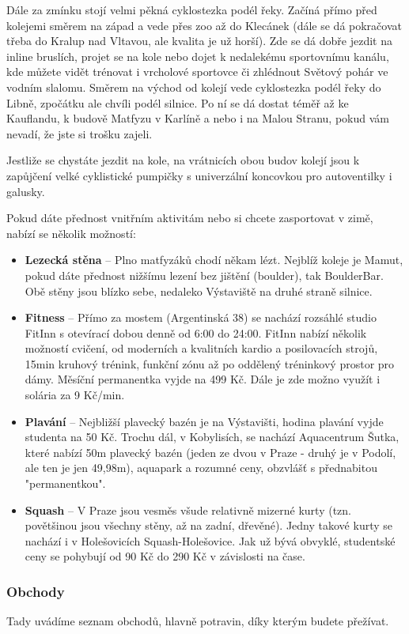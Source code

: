 Dále za zmínku stojí velmi pěkná cyklostezka podél řeky. Začíná přímo před
kolejemi směrem na západ a vede přes zoo až do Klecánek (dále se dá pokračovat
třeba do Kralup nad Vltavou, ale kvalita je už horší). Zde se dá dobře jezdit na
inline bruslích, projet se na kole nebo dojet k nedalekému sportovnímu kanálu,
kde můžete vidět trénovat i vrcholové sportovce či zhlédnout Světový pohár ve
vodním slalomu. Směrem na východ od kolejí vede cyklostezka podél řeky do Libně,
zpočátku ale chvíli podél silnice. Po ní se dá dostat téměř až ke Kauflandu, k
budově Matfyzu v Karlíně a nebo i na Malou Stranu, pokud vám nevadí, že jste si
trošku zajeli.

Jestliže se chystáte jezdit na kole, na vrátnicích obou budov kolejí jsou k
zapůjčení velké cyklistické pumpičky s univerzální koncovkou pro autoventilky i
galusky.

Pokud dáte přednost vnitřním aktivitám nebo si chcete zasportovat v zimě, nabízí
se několik možností:
\begin{itemize}
\item \textbf{Lezecká stěna} – Plno matfyzáků chodí někam lézt. Nejblíž koleje
je Mamut, pokud dáte přednost nižšímu lezení bez jištění (boulder), tak
BoulderBar. Obě stěny jsou blízko sebe, nedaleko Výstaviště na druhé straně
silnice.
\item \textbf{Fitness} – Přímo za mostem (Argentinská 38) se nachází rozsáhlé
studio FitInn s otevírací dobou denně od 6:00 do 24:00. FitInn nabízí několik
možností cvičení, od moderních a kvalitních kardio a posilovacích strojů, 15min
kruhový trénink, funkční zónu až po oddělený tréninkový prostor pro dámy.
Měsíční permanentka vyjde na 499 Kč. Dále je zde možno využít i solária za 9
Kč/min.
\item \textbf{Plavání} – Nejbližší plavecký bazén je na Výstavišti, hodina
plavání vyjde studenta na 50 Kč. Trochu dál, v Kobylisích, se nachází
Aquacentrum Šutka, které nabízí 50m plavecký bazén (jeden ze dvou v Praze -
druhý je v Podolí, ale ten je jen 49,98m), aquapark a rozumné ceny, obzvlášť s
přednabitou "permanentkou".
\item \textbf{Squash} – V Praze jsou vesměs všude relativně mizerné kurty (tzn.
povětšinou jsou všechny stěny, až na zadní, dřevěné). Jedny takové kurty se
nachází i v Holešovicích Squash-Holešovice. Jak už bývá obvyklé, studentské ceny
se pohybují od 90 Kč do 290 Kč v závislosti na čase.
\end{itemize}


\subsubsection{Obchody}
Tady uvádíme seznam obchodů, hlavně potravin, díky kterým budete přežívat.


